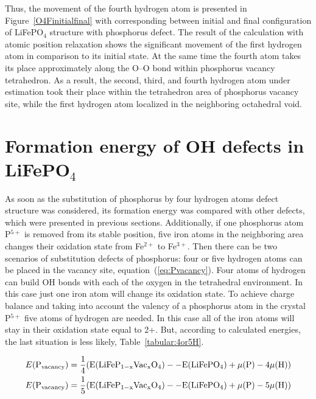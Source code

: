 \newpage
Thus, the movement of the fourth hydrogen atom is presented in Figure~\ref{O4Finitialfinal} with corresponding between initial and final configuration of LiFePO$_{4}$ structure with phosphorus defect. The result of the calculation with atomic position relaxation shows the significant movement of the first hydrogen atom in comparison to its initial state. At the same time the fourth atom takes its place approximately along the O--O bond within phosphorus vacancy tetrahedron. As a result, the second, third, and fourth hydrogen atom under estimation took their place within the tetrahedron area of phosphorus vacancy site, while the first hydrogen atom localized in the neighboring octahedral void.

\par\bigskip
\section{Formation energy of OH defects in LiFePO$_4$}

As soon as the substitution of phosphorus by four hydrogen atoms defect structure was considered, its formation energy was compared with other defects, which were presented in previous sections. Additionally, if one phosphorus atom P$^{5+}$ is removed from its stable position, five iron atoms in the neighboring area changes their oxidation state from Fe$^{2+}$ to Fe$^{3+}$. Then there can be two scenarios of substitution defects of phosphorus: four or five hydrogen atoms can be placed in the vacancy site, equation~(\ref{eq:Pvacancy}). 
Four atoms of hydrogen can build OH bonds with each of the oxygen in the tetrahedral environment. In this case just one iron atom will change its oxidation state. To achieve charge balance and taking into account the valency of a phosphorus atom in the crystal P$^{5+}$ five atoms of hydrogen are needed. In this case all of the iron atoms will stay in their oxidation state equal to 2+. But, according to calculated energies, the last situation is less likely, Table~\ref{tabular:4or5H}.

\begin{eqnarray}
\label{eq:Pvacancy}
&E(\rm P_{vacancy})=\frac{1}{4}(E(\rm LiFeP_{1-x}Vac_{x}O_4)--E(\rm LiFePO_4)+\mu(\rm P)-4\mu(\rm H)) \\ \nonumber
&E(\rm P_{vacancy})=\frac{1}{5}(E(\rm LiFeP_{1-x}Vac_{x}O_4)--E(\rm LiFePO_4)+\mu(\rm P)-5\mu(\rm H))
\end{eqnarray}

